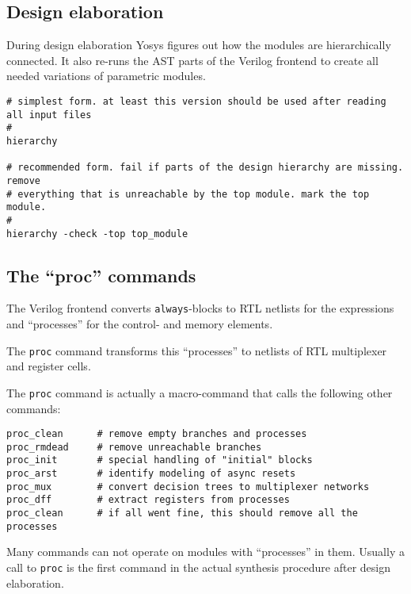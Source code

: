 
\subsection{Design elaboration}

\begin{frame}[fragile]{\subsecname}
During design elaboration Yosys figures out how the modules are hierarchically
connected. It also re-runs the AST parts of the Verilog frontend to create
all needed variations of parametric modules.

\bigskip
\begin{lstlisting}[xleftmargin=0.5cm, basicstyle=\ttfamily\fontsize{8pt}{10pt}\selectfont]
# simplest form. at least this version should be used after reading all input files
#
hierarchy

# recommended form. fail if parts of the design hierarchy are missing. remove
# everything that is unreachable by the top module. mark the top module.
#
hierarchy -check -top top_module
\end{lstlisting}
\end{frame}


\subsection{The ``proc'' commands}

\begin{frame}[fragile]{\subsecname}
The Verilog frontend converts {\tt always}-blocks to RTL netlists for the
expressions and ``processes'' for the control- and memory elements.

\medskip
The {\tt proc} command transforms this ``processes'' to netlists of RTL
multiplexer and register cells.

\medskip
The {\tt proc} command is actually a macro-command that calls the following
other commands:

\begin{lstlisting}[xleftmargin=0.5cm, basicstyle=\ttfamily\fontsize{8pt}{10pt}\selectfont]
proc_clean      # remove empty branches and processes
proc_rmdead     # remove unreachable branches
proc_init       # special handling of "initial" blocks
proc_arst       # identify modeling of async resets
proc_mux        # convert decision trees to multiplexer networks
proc_dff        # extract registers from processes
proc_clean      # if all went fine, this should remove all the processes
\end{lstlisting}

\medskip
Many commands can not operate on modules with ``processes'' in them. Usually
a call to {\tt proc} is the first command in the actual synthesis procedure
after design elaboration.
\end{frame}

